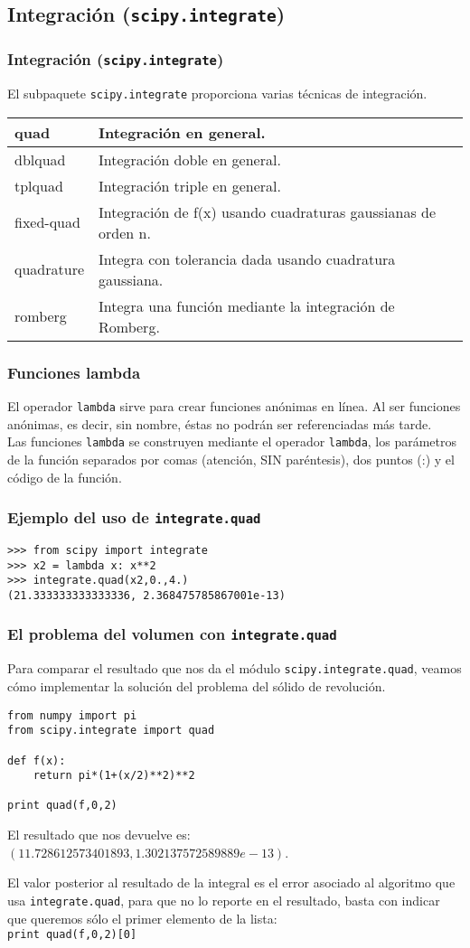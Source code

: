 \subsection{Integración (\texttt{scipy.integrate})}
\begin{frame}
\frametitle{Integración (\texttt{scipy.integrate})}
El subpaquete \texttt{scipy.integrate} proporciona varias técnicas de integración.
\fontsize{12}{12}\selectfont
	\begin{tabular}{l | p{8cm}}
	quad 		& Integración en general. \\ \hline
	dblquad 	& Integración doble en general. \\ \hline
	tplquad 	& Integración triple en general. \\ \hline
	fixed-quad 	& Integración de f(x) usando cuadraturas gaussianas de orden n. \\ \hline
	quadrature 	& Integra con tolerancia dada usando cuadratura gaussiana. \\ \hline
	romberg 	& Integra una función mediante la integración de Romberg.
\end{tabular}
\end{frame}
\begin{frame}
\frametitle{Funciones lambda}
El operador \texttt{lambda} sirve para crear funciones anónimas en línea. Al ser funciones anónimas, es decir, sin nombre, éstas no podrán ser referenciadas más tarde.
\\
\medskip
Las funciones \texttt{lambda} se construyen mediante el operador \texttt{lambda}, los parámetros de la función separados por comas (atención, SIN paréntesis), dos puntos (:) y el código de la función.
\end{frame}
\begin{frame}[fragile]
\frametitle{Ejemplo del uso de \texttt{integrate.quad}}
\begin{verbatim}
>>> from scipy import integrate
>>> x2 = lambda x: x**2
>>> integrate.quad(x2,0.,4.)
(21.333333333333336, 2.368475785867001e-13)
\end{verbatim}
\end{frame}
\begin{frame}[fragile]
\frametitle{El problema del volumen con \texttt{integrate.quad}}
Para comparar el resultado que nos da el módulo \texttt{scipy.integrate.quad}, veamos cómo implementar la solución del problema del sólido de revolución.
\begin{lstlisting}
from numpy import pi
from scipy.integrate import quad

def f(x):
    return pi*(1+(x/2)**2)**2
   
print quad(f,0,2)
\end{lstlisting}
\pause
El resultado que nos devuelve es: $(11.728612573401893, 1.302137572589889e-13)$.
\end{frame}
\begin{frame}[fragile]
El valor posterior al resultado de la integral es el error asociado al algoritmo que usa \texttt{integrate.quad}, para que no lo reporte en el resultado, basta con indicar que queremos sólo el primer elemento de la lista:
\\
\bigskip
\verb|print quad(f,0,2)[0]|
\end{frame}
